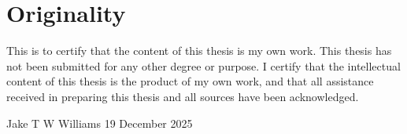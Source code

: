 \chapter{Originality}
This is to certify that the content of this thesis is my own work. This thesis has not been submitted for any other degree or purpose. I certify that the intellectual content of this thesis is the product of my own work, and that all assistance received in preparing this thesis and all sources have been acknowledged.

\vspace{1cm}


Jake T W Williams \hspace{2cm} 19 December 2025